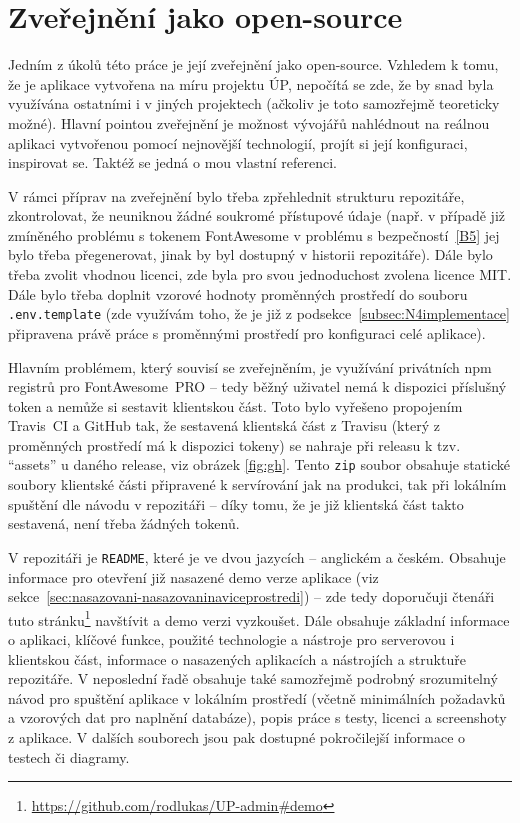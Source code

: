 \chapter{Zveřejnění jako open-source}\label{chap:zverejnenijakoopensource}

Jedním z úkolů této práce je její zveřejnění jako open-source. Vzhledem k tomu, že je aplikace vytvořena na míru projektu ÚP, nepočítá se zde, že by snad byla využívána ostatními i v jiných projektech (ačkoliv je toto samozřejmě teoreticky možné). Hlavní pointou zveřejnění je možnost vývojářů nahlédnout na reálnou aplikaci vytvořenou pomocí nejnovější technologií, projít si její konfiguraci, inspirovat se. Taktéž se jedná o mou vlastní referenci.

V rámci příprav na zveřejnění bylo třeba zpřehlednit strukturu repozitáře, zkontrolovat, že neuniknou žádné soukromé přístupové údaje (např. v případě již zmíněného problému s tokenem FontAwesome v problému s bezpečností~\ref{B5} jej bylo třeba přegenerovat, jinak by byl dostupný v historii repozitáře). Dále bylo třeba zvolit vhodnou licenci, zde byla pro svou jednoduchost zvolena licence MIT. Dále bylo třeba doplnit vzorové hodnoty proměnných prostředí do souboru \verb|.env.template| (zde využívám toho, že je již z podsekce~\ref{subsec:N4implementace} připravena právě práce s proměnnými prostředí pro konfiguraci celé aplikace).

Hlavním problémem, který souvisí se zveřejněním, je využívání privátních npm registrů pro FontAwesome~PRO -- tedy běžný uživatel nemá k dispozici příslušný token a nemůže si sestavit klientskou část. Toto bylo vyřešeno propojením Travis~CI a GitHub tak, že sestavená klientská část z Travisu (který z proměnných prostředí má k dispozici tokeny) se nahraje při releasu k tzv. \enquote{assets} u daného release, viz obrázek \ref{fig:gh}. Tento \verb|zip| soubor obsahuje statické soubory klientské části připravené k servírování jak na produkci, tak při lokálním spuštění dle návodu v repozitáři -- díky tomu, že je již klientská část takto sestavená, není třeba žádných tokenů.

V repozitáři je \verb|README|, které je ve dvou jazycích -- anglickém a českém. Obsahuje informace pro otevření již nasazené demo verze aplikace (viz sekce~\ref{sec:nasazovani-nasazovaninaviceprostredi}) -- zde tedy doporučuji čtenáři tuto stránku\footnote{\url{https://github.com/rodlukas/UP-admin\#demo}} navštívit a demo verzi vyzkoušet. Dále obsahuje základní informace o aplikaci, klíčové funkce, použité technologie a nástroje pro serverovou i klientskou část, informace o nasazených aplikacích a nástrojích a struktuře repozitáře. V neposlední řadě obsahuje také samozřejmě podrobný srozumitelný návod pro spuštění aplikace v lokálním prostředí (včetně minimálních požadavků a vzorových dat pro naplnění databáze), popis práce s testy, licenci a screenshoty z aplikace. V dalších souborech jsou pak dostupné pokročilejší informace o testech či diagramy.

